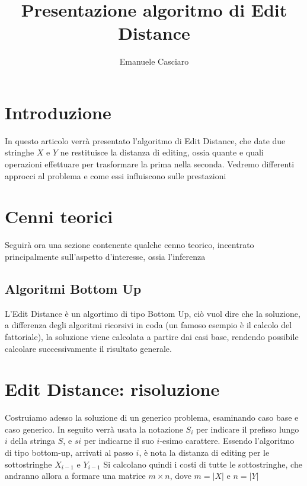 \documentclass{article}
\author{Emanuele Casciaro}
\title{Presentazione algoritmo di Edit Distance}
\begin{document}
\maketitle
\tableofcontents

\newpage

\section{Introduzione}
In questo articolo verrà presentato l'algoritmo di Edit Distance, che date due stringhe $X$ e $Y$ ne restituisce la distanza di editing, ossia quante e quali operazioni effettuare per trasformare la prima nella seconda. Vedremo differenti approcci al problema e come essi influiscono sulle prestazioni

\section{Cenni teorici}
Seguirà ora una sezione contenente qualche cenno teorico, incentrato principalmente sull'aspetto d'interesse, ossia l'inferenza 

\subsection{Algoritmi Bottom Up}
L'Edit Distance è un algortimo di tipo Bottom Up, ciò vuol dire che la soluzione, a differenza degli algoritmi ricorsivi in coda (un famoso esempio è il calcolo del fattoriale), la soluzione viene calcolata a partire dai casi base, rendendo possibile calcolare successivamente il risultato generale.

\section{Edit Distance: risoluzione}
Costruiamo adesso la soluzione di un generico problema, esaminando caso base e caso generico.
In seguito verrà usata la notazione $S_i$ per indicare il prefisso lungo $i$ della stringa $S$, e $si$ per indicarne il suo $i$-esimo carattere.\newline
Essendo l'algoritmo di tipo bottom-up, arrivati al passo $i$, è nota la distanza di editing per le sottostringhe $X_{i-1}$ e $Y_{i-1}$\newline
Si calcolano quindi i costi di tutte le sottostringhe, che andranno allora a formare una matrice $m \times n$, dove $m = |X|$ e $n = |Y|$
\end{document}
